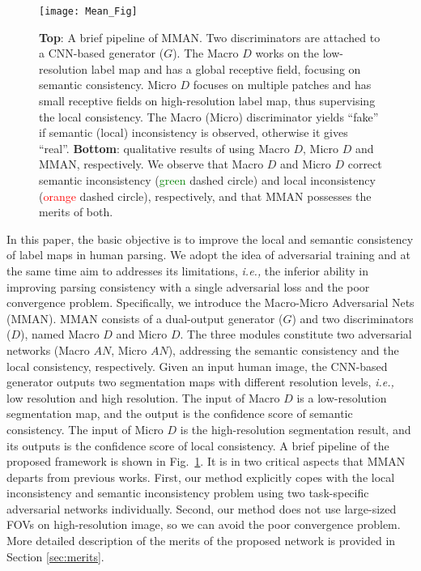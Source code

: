 \documentclass[runningheads]{llncs}
\begin{document}
\begin{figure}[t]
\centering
\texttt{[image: Mean\_Fig]}
\caption{\textbf{Top}: A brief pipeline of MMAN. Two discriminators are attached to a CNN-based generator ($G$). The Macro $D$ works on the low-resolution label map and has a global receptive field, focusing on semantic consistency. Micro $D$ focuses on multiple patches and has small receptive fields on high-resolution label map, thus supervising the local consistency. The Macro (Micro) discriminator yields ``fake'' if semantic (local) inconsistency is observed, otherwise it gives ``real''. \textbf{Bottom}:  qualitative results of using Macro $D$, Micro $D$ and MMAN, respectively. We observe that Macro $D$ and Micro $D$ correct semantic inconsistency (\textcolor{green}{green} dashed circle) and local inconsistency (\textcolor{red}{orange} dashed circle), respectively, and that MMAN possesses the merits of both.}
\label{fig:Brief}
\end{figure}

In this paper, the basic objective is to improve the local and semantic consistency of label maps in human parsing. We adopt the idea of adversarial training and at the same time aim to addresses its limitations, \emph{i.e.,} the inferior ability in improving parsing consistency with a single adversarial loss and the poor convergence problem. Specifically, we introduce the Macro-Micro Adversarial Nets (MMAN).
MMAN consists of a dual-output generator ($G$) and two discriminators ($D$), named Macro $D$ and Micro $D$. The three modules constitute two adversarial networks (Macro $AN$, Micro $AN$), addressing the semantic consistency and the local consistency, respectively. Given an input human image, the CNN-based generator outputs two segmentation maps with different resolution levels, \emph{i.e.,} low resolution and high resolution. The input of Macro ${D}$ is a low-resolution segmentation map, and the output is the confidence score of semantic consistency. The input of Micro $D$ is the high-resolution segmentation result, and its outputs is the confidence score of local consistency. A brief pipeline of the proposed framework is shown in Fig.~\ref{fig:Brief}.
It is in two critical aspects that MMAN departs from previous works.
First, our method explicitly copes with the local inconsistency and semantic inconsistency problem using two task-specific adversarial networks individually. Second, our method does not use large-sized FOVs on high-resolution image, so we can avoid the poor convergence problem. More detailed description of the merits of the proposed network is provided in Section \ref{sec:merits}.
\end{document}
